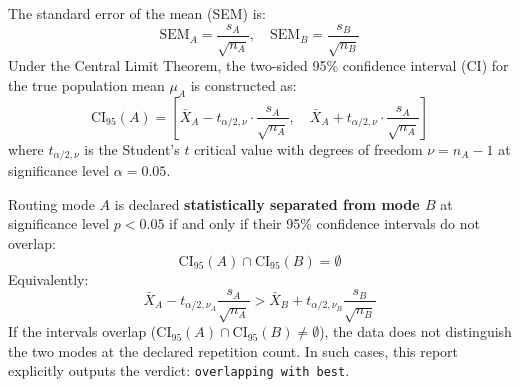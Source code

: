The standard error of the mean (SEM) is:
\begin{equation}
  \text{SEM}_A = \frac{s_A}{\sqrt{n_A}}, \quad \text{SEM}_B = \frac{s_B}{\sqrt{n_B}}
\end{equation}
Under the Central Limit Theorem, the two-sided 95\% confidence interval (CI) for the true population mean $\mu_A$ is constructed as:
\begin{equation}
  \text{CI}_{95}(A) = \left[ \bar{X}_A - t_{\alpha/2, \nu} \cdot \frac{s_A}{\sqrt{n_A}}, \quad \bar{X}_A + t_{\alpha/2, \nu} \cdot \frac{s_A}{\sqrt{n_A}} \right]
\end{equation}
where $t_{\alpha/2, \nu}$ is the Student's $t$ critical value with degrees of freedom $\nu = n_A - 1$ at significance level $\alpha = 0.05$.

\begin{formulabox}
Routing mode $A$ is declared \textbf{statistically separated from mode $B$} at significance level $p < 0.05$ if and only if their 95\% confidence intervals do not overlap:
\begin{equation}
  \text{CI}_{95}(A) \cap \text{CI}_{95}(B) = \emptyset
\end{equation}
Equivalently:
\begin{equation}
  \bar{X}_A - t_{\alpha/2, \nu_A} \frac{s_A}{\sqrt{n_A}} > \bar{X}_B + t_{\alpha/2, \nu_B} \frac{s_B}{\sqrt{n_B}}
\end{equation}
If the intervals overlap ($\text{CI}_{95}(A) \cap \text{CI}_{95}(B) \ne \emptyset$), the data does not distinguish the two modes at the declared repetition count. In such cases, this report explicitly outputs the verdict: \texttt{overlapping with best}.
\end{formulabox}

